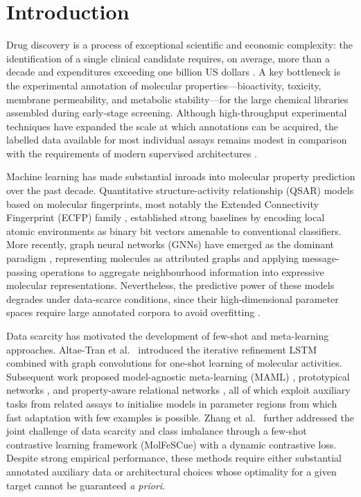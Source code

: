 \section{Introduction}\label{sec:intro}

Drug discovery is a process of exceptional scientific and economic
complexity: the identification of a single clinical candidate
requires, on average, more than a decade and expenditures exceeding
one billion US dollars \cite{dimasi2016innovation}. A key bottleneck is the
experimental annotation of molecular properties---bioactivity,
toxicity, membrane permeability, and metabolic stability---for the
large chemical libraries assembled during early-stage screening.
Although high-throughput experimental techniques have expanded the
scale at which annotations can be acquired, the labelled data
available for most individual assays remains modest in comparison
with the requirements of modern supervised architectures \cite{walters2021applications}.

Machine learning has made substantial inroads into molecular property
prediction over the past decade. Quantitative structure-activity
relationship (QSAR) models based on molecular fingerprints, most
notably the Extended Connectivity Fingerprint (ECFP) family
\cite{wu2018moleculenet}, established strong baselines by encoding local atomic
environments as binary bit vectors amenable to conventional
classifiers. More recently, graph neural networks (GNNs) have
emerged as the dominant paradigm \cite{xiong2020pushing}, representing molecules
as attributed graphs and applying message-passing operations to
aggregate neighbourhood information into expressive molecular
representations. Nevertheless, the predictive power of these models
degrades under data-scarce conditions, since their high-dimensional
parameter spaces require large annotated corpora to avoid
overfitting \cite{guo2021fewshot}.

Data scarcity has motivated the development of few-shot and
meta-learning approaches. Altae-Tran et al.\ \cite{altaetran2017low} introduced
the iterative refinement LSTM combined with graph convolutions for
one-shot learning of molecular activities. Subsequent work proposed
model-agnostic meta-learning (MAML) \cite{vella2023fewshot}, prototypical
networks \cite{fang2023evidential}, and property-aware relational networks
\cite{wang2021property}, all of which exploit auxiliary tasks from related
assays to initialise models in parameter regions from which fast
adaptation with few examples is possible. Zhang et al.\ \cite{zhang2024molfescue}
further addressed the joint challenge of data scarcity and class
imbalance through a few-shot contrastive learning framework
(MolFeSCue) with a dynamic contrastive loss. Despite strong
empirical performance, these methods require either substantial
annotated auxiliary data or architectural choices whose optimality
for a given target cannot be guaranteed \textit{a priori}.

